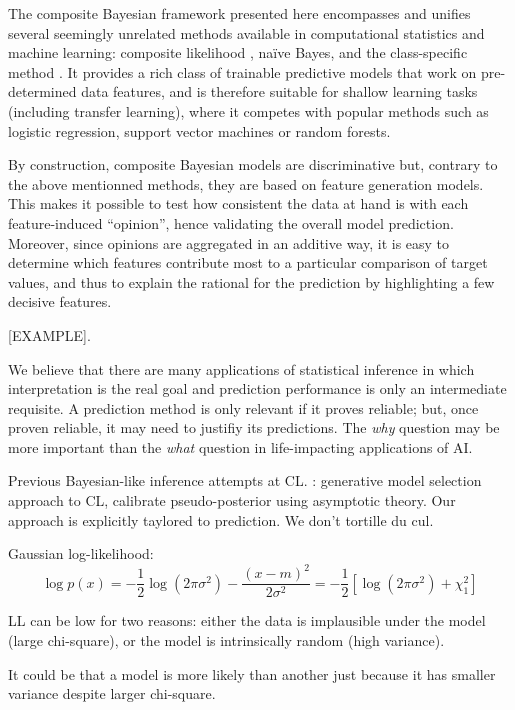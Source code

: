 \documentclass[english]{scrartcl}
\begin{document}
The composite Bayesian framework presented here encompasses and unifies several seemingly unrelated methods available in computational statistics and machine learning: composite likelihood \cite{Varin-11}, na\"ive Bayes, and the class-specific method \cite{Baggenstoss-03}. It provides a rich class of trainable predictive models that work on pre-determined data features, and is therefore suitable for shallow learning tasks (including transfer learning), where it competes with popular methods such as logistic regression, support vector machines or random forests.

By construction, composite Bayesian models are discriminative but, contrary to the above mentionned methods, they are based on feature generation models. This makes it possible to test how consistent the data at hand is with each feature-induced ``opinion'', hence validating the overall model prediction. Moreover, since opinions are aggregated in an additive way, it is easy to determine which features contribute most to a particular comparison of target values, and thus to explain the rational for the prediction by highlighting a few decisive features. 

[EXAMPLE]. 

We believe that there are many applications of statistical inference in which interpretation is the real goal and prediction performance is only an intermediate requisite. A prediction method is only relevant if it proves reliable; but, once proven reliable, it may need to justifiy its predictions. The {\em why} question may be more important than the {\em what} question in life-impacting applications of AI. 


Previous Bayesian-like inference attempts at CL. \cite{Wang-14}: generative model selection approach to CL, \cite{Pauli-11,Ribatet-12} calibrate pseudo-posterior using asymptotic theory. Our approach is explicitly taylored to prediction. We don't tortille du cul.

Gaussian log-likelihood:
$$
\log p(x)
= - \frac{1}{2} \log (2\pi\sigma^2) - \frac{(x-m)^2}{2\sigma^2}
= - \frac{1}{2} [\log (2\pi\sigma^2) + \chi_1^2]
$$

LL can be low for two reasons: either the data is implausible under the model (large chi-square), or the model is intrinsically random (high variance).

It could be that a model is more likely than another just because it has smaller variance despite larger chi-square. 
\end{document}
